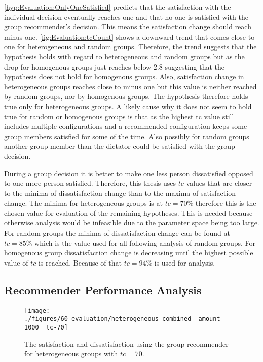 \autoref{hyp:Evaluation:OnlyOneSatisfied} predicts that the satisfaction with the individual decision eventually reaches one and that no one is satisfied with the group recommender's decision. This means the satisfaction change should reach minus one. \autoref{fig:Evaluation:tcCount} shows a downward trend that comes close to one for heterogeneous and random groups. Therefore, the trend suggests that the hypothesis holds with regard to heterogeneous and random groups but as the drop for homogenous groups just reaches below $2.8$ suggesting that the hypothesis does not hold for homogenous groups. Also, satisfaction change in heterogeneous groups reaches close to minus one but this value is neither reached by random groups, nor by homogenous groups. The hypothesis therefore holds true only for heterogeneous groups. A likely cause why it does not seem to hold true for random or homogenous groups is that as the highest tc value still includes multiple configurations and a recommended configuration keeps some group members satisfied for some of the time. Also possibly for random groups another group member than the dictator could be satisfied with the group decision.

During a group decision it is better to make one less person dissatisfied opposed to one more person satisfied. Therefore, this thesis uses $tc$ values that are closer to the minima of dissatisfaction change than to the maxima of satisfaction change. The minima for heterogeneous groups is at $tc = 70\%$ therefore this is the chosen value for evaluation of the remaining hypotheses. This is needed because otherwise analysis would be infeasible due to the parameter space being too large. For random groups the minima of dissatisfaction change can be found at $tc = 85\%$ which is the value used for all following analysis of random groups. For homogenous group dissatisfaction change is decreasing until the highest possible value of $tc$ is reached. Because of that $tc = 94\%$ is used for analysis.

\subsection{Recommender Performance Analysis}

\begin{figure}[p]
    \centering
    \texttt{[image: ./figures/60\_evaluation/heterogeneous\_combined\_\_amount-1000\_\_tc-70]}
    \caption{The satisfaction and dissatisfaction using the group recommender for heterogeneous groups with $tc = 70$.}
    \label{fig:Evaluation:HeteroSatisfaction}
\end{figure}

